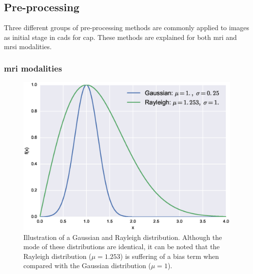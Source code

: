 \subsection{Pre-processing}\label{subsec:chp3img-reg:prepro}
Three different groups of pre-processing methods are commonly applied to images as initial stage in \acp{cad} for \ac{cap}.
These methods are explained for both \ac{mri} and \ac{mrsi} modalities.%


\subsubsection{\acs*{mri} modalities}\label{subsubsec:ch3:mriprepro}

\begin{figure}
\centering
	\includegraphics[width=0.7\linewidth]{3_review/figures/processing/pre-processing/noise/noisedistr.eps}
	\caption[Illustration of a Gaussian and Rayleigh distributions.]{Illustration of a Gaussian and Rayleigh distribution. Although the mode of these distributions are identical, it can be noted that the Rayleigh distribution ($\mu=1.253$) is suffering of a bias term when compared with the Gaussian distribution ($\mu=1$).}
	\label{fig:noisedistr}
\end{figure}

